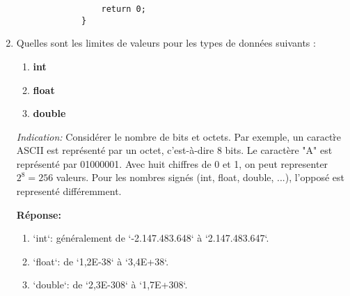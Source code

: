 \begin{enumerate}
\begin{lstlisting}
			     return 0;
			 }
		 \end{lstlisting}
	
	\item Quelles sont les limites de valeurs pour les types de données suivants :
	\begin{enumerate}
		\item \textbf{int}
		\item \textbf{float}
		\item \textbf{double}
	\end{enumerate}
	\textit{Indication:} Consid\'erer le nombre de bits et octets. Par exemple, un caract\`re ASCII est repr\'esent\'e par un octet, c'est-\`a-dire 8 bits. Le caract\`ere "A" est repr\'esent\'e par 01000001. Avec huit chiffres de 0 et 1, on peut representer $2^8 = 256$ valeurs.  Pour les nombres  sign\'es (int, float, double, ...), l'oppos\'e est represent\'e diff\'eremment. 
	
	 \textbf{Réponse:}
	 \begin{enumerate}
	 	\item `int`: généralement de `-2.147.483.648` à `2.147.483.647`.
	 \item `float`: de `1,2E-38` à `3,4E+38`.
	 \item `double`: de `2,3E-308` à `1,7E+308`.
	 \end{enumerate}
\end{enumerate}

